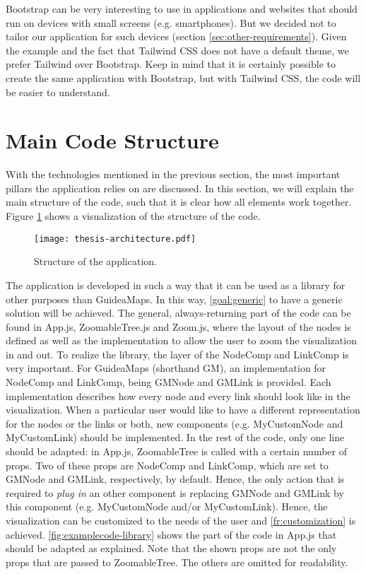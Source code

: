 Bootstrap can be very interesting to use in applications and websites that should run on devices with small screens (e.g. smartphones). But we decided not to tailor our application for such devices (section \ref{sec:other-requirements}). Given the example and the fact that Tailwind CSS does not have a default theme, we prefer Tailwind over Bootstrap. Keep in mind that it is certainly possible to create the same application with Bootstrap, but with Tailwind CSS, the code will be easier to understand.\\





\section{Main Code Structure}\label{sec:structure}
With the technologies mentioned in the previous section, the most important pillars the application relies on are discussed. In this section, we will explain the main structure of the code, such that it is clear how all elements work together. Figure \ref{fig:overall-structure} shows a visualization of the structure of the code.
\begin{figure}[H]
	\centering
	\texttt{[image: thesis-architecture.pdf]}
	\caption{Structure of the application.}
	\label{fig:overall-structure}
\end{figure}

The application is developed in such a way that it can be used as a library for other purposes than GuideaMaps. In this way, \ref{goal:generic} to have a generic solution will be achieved. The general, always-returning part of the code can be found in App.js, ZoomableTree.js and Zoom.js, where the layout of the nodes is defined as well as the implementation to allow the user to zoom the visualization in and out. To realize the library, the layer of the NodeComp and LinkComp is very important. For GuideaMaps (shorthand GM), an implementation for NodeComp and LinkComp, being GMNode and GMLink is provided. Each implementation describes how every node and every link should look like in the visualization. When a particular user would like to have a different representation for the nodes or the links or both, new components (e.g. MyCustomNode and MyCustomLink) should be implemented. In the rest of the code, only one line should be adapted: in App.js, ZoomableTree is called with a certain number of props. Two of these props are NodeComp and LinkComp, which are set to GMNode and GMLink, respectively, by default. Hence, the only action that is required to \textit{plug in} an other component is replacing GMNode and GMLink by this component (e.g. MyCustomNode and/or MyCustomLink). Hence, the visualization can be customized to the needs of the user and \ref{fr:customization} is achieved. \autoref{fig:examplecode-library} shows the part of the code in App.js that should be adapted as explained. Note that the shown props are not the only props that are passed to ZoomableTree. The others are omitted for readability.\\

